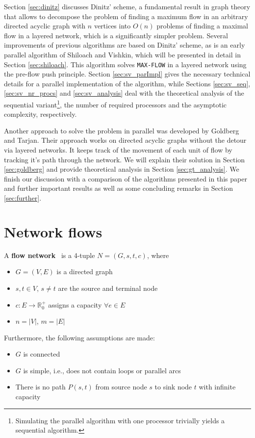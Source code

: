 \documentclass[a4paper,10pt, twocolumn]{article}
\begin{document}
Section \ref{sec:dinitz} discusses Dinitz' scheme, a fundamental result in graph theory that allows to  decompose the problem of finding a maximum flow in an arbitrary directed acyclic graph with $n$ vertices into $O(n)$ problems of finding a maximal flow in a layered network, which is a significantly simpler problem. Several improvements of previous algorithms are based on Dinitz' scheme, as is an early parallel algorithm of Shiloach and Vishkin, which will be presented in detail in  Section \ref{sec:shiloach}. This algorithm solves \lstinline|MAX-FLOW| in a layered network using the pre-flow push principle. Section \ref{sec:sv_parImpl} gives the necessary technical details for a parallel implementation of the algorithm, while Sections \ref{sec:sv_seq}, \ref{sec:sv_nr_procs} and \ref{sec:sv_analysis} deal with the theoretical analysis of the sequential variant\footnote{Simulating the parallel algorithm with one processor trivially yields a sequential algorithm.}, the number of required processors and the asymptotic complexity, respectively.

Another approach to solve the problem in parallel was developed by Goldberg and Tarjan. Their approach works on directed acyclic graphs without the detour via layered networks. It keeps track of the movement of each unit of flow by tracking it's path through the network. We will explain their solution in Section \ref{sec:goldberg} and provide theoretical analysis in Section \ref{sec:gt_analysis}. We finish our discussion with a comparison of the algorithms presented in this paper and further important results as well as some concluding remarks in Section \ref{sec:further}. 

\section{Network flows}
\label{sec:networkFlows}
A \textbf{flow network}~\cite{ahuja93} is a 4-tuple $N = (G,s,t,c)$, where
\begin{itemize}
	\item $G =(V,E)$ is a directed graph
    \item $s, t \in V$, $s \neq t$ are the source and terminal node
   	\item $c:E\rightarrow \mathbb{R}_0^{+}$ assigns a capacity $\forall e \in E$
   	\item $n=\lvert V\rvert$, $m=\lvert E\rvert$
\end{itemize}

Furthermore, the following assumptions are made:
\begin{itemize}
	\item $G$ is connected
	\item $G$ is simple, i.e., does not contain loops or parallel arcs
	\item There is no path $P(s,t)$ from source node $s$ to sink node $t$ with infinite capacity
\end{itemize}
\end{document}
